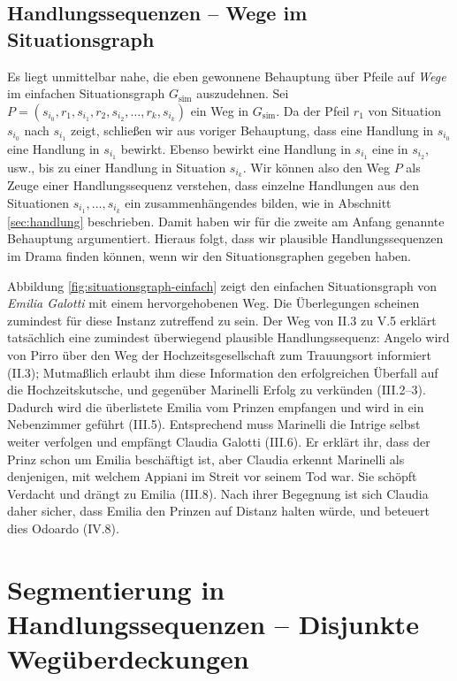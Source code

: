 \documentclass[a4paper,10pt,abstract=true,headings=small]{scrartcl}
\begin{document}
\subsection{Handlungssequenzen – Wege im Situationsgraph}\label{sec:wege}


Es liegt unmittelbar nahe, die eben gewonnene Behauptung über Pfeile auf \emph{Wege} im einfachen Situationsgraph $G_\text{sim}$ auszudehnen.
Sei $P=(s_{i_0}, r_1, s_{i_1}, r_2, s_{i_2}, \dots, r_k, s_{i_k})$ ein Weg in $G_\text{sim}$. 
Da der Pfeil $r_1$ von Situation $s_{i_0}$ nach $s_{i_1}$ zeigt, schließen wir aus voriger Behauptung, dass eine Handlung in $s_{i_0}$ eine Handlung in $s_{i_1}$ bewirkt.
Ebenso bewirkt eine Handlung in $s_{i_1}$ eine in $s_{i_2}$, usw., bis zu einer Handlung in Situation $s_{i_k}$.
Wir können also den Weg $P$ als Zeuge einer Handlungssequenz verstehen, dass einzelne Handlungen aus den Situationen $s_{i_1}, \dots, s_{i_k}$ ein zusammenhängendes  bilden, wie in Abschnitt \ref{sec:handlung} beschrieben.
Damit haben wir für die zweite am Anfang genannte Behauptung argumentiert.
Hieraus folgt, dass wir plausible Handlungssequenzen im Drama finden können, wenn wir den Situationsgraphen gegeben haben. 

\label{pos:weg-diskussion}Abbildung \ref{fig:situationsgraph-einfach} zeigt den einfachen Situationsgraph von \emph{Emilia Galotti} mit einem hervorgehobenen Weg.
Die Überlegungen scheinen zumindest für diese Instanz zutreffend zu sein.
Der Weg von II.3 zu V.5 erklärt tatsächlich eine zumindest überwiegend plausible Handlungssequenz:
Angelo wird von Pirro über den Weg der Hochzeitsgesellschaft zum Trauungsort informiert (II.3); Mutmaßlich erlaubt ihm diese Information den erfolgreichen Überfall auf die Hochzeitskutsche, und gegenüber Marinelli Erfolg zu verkünden (III.2–3).
Dadurch wird die überlistete Emilia vom Prinzen empfangen und wird in ein Nebenzimmer geführt (III.5).
Entsprechend muss Marinelli die Intrige selbst weiter verfolgen und empfängt Claudia Galotti  (III.6).
Er erklärt ihr, dass der Prinz schon um Emilia beschäftigt ist, aber Claudia erkennt Marinelli als denjenigen, mit welchem Appiani im Streit vor seinem Tod war.
Sie schöpft Verdacht und drängt zu Emilia (III.8).
Nach ihrer Begegnung ist sich Claudia daher sicher, dass Emilia den Prinzen auf Distanz halten würde, und beteuert dies Odoardo (IV.8).



\section{Segmentierung in Handlungssequenzen – Disjunkte Wegüberdeckungen}\label{sec:segmentierung}
\end{document}
